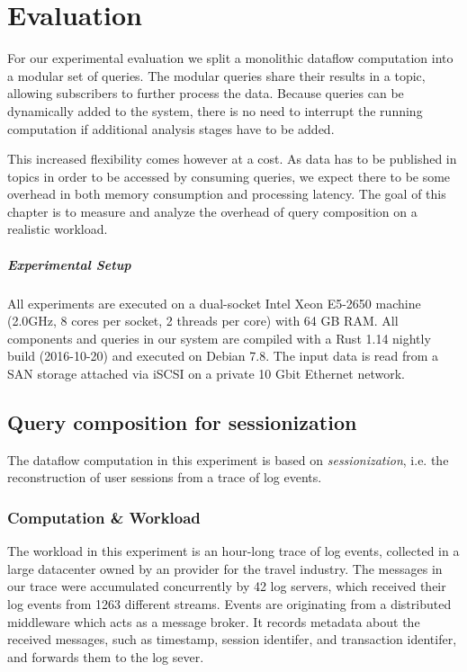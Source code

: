 \chapter{Evaluation}\label{ch:evaluation}

For our experimental evaluation we split a monolithic dataflow computation into a
modular set of queries. The modular queries share their results in a topic,
allowing subscribers to further process the data. Because queries
can be dynamically added to the system, there is no need to interrupt the
running computation if additional analysis stages have to be added.

This increased flexibility comes however at a cost. As data has to be published
in topics in order to be accessed by consuming queries, we expect there to be
some overhead in both memory consumption and processing latency. The goal
of this chapter is to measure and analyze the overhead of query composition
on a realistic workload.

\paragraph{Experimental Setup}

All experiments are executed on a dual-socket Intel Xeon E5-2650
machine (2.0GHz, 8 cores per socket, 2 threads per core) with 64 GB RAM. All components and
queries in our system are compiled with a Rust 1.14 nightly build (2016-10-20)
and executed on Debian 7.8. The input data is read from a SAN storage attached
via iSCSI on a private 10 Gbit Ethernet network.

\section{Query composition for sessionization}

The dataflow computation in this experiment is based on \emph{sessionization},
i.e. the reconstruction of user sessions from a trace of log events.

\subsection{Computation \& Workload}

The workload in this experiment is an hour-long trace of log events, collected in
a large datacenter owned by an provider for the travel industry. The messages in our trace were
accumulated concurrently by 42 log servers, which received their log events from
1263 different streams. Events are originating from a distributed middleware which acts
as a message broker. It records metadata about the received messages, such as
timestamp, session identifer, and transaction identifer, and forwards them to
the log sever.


